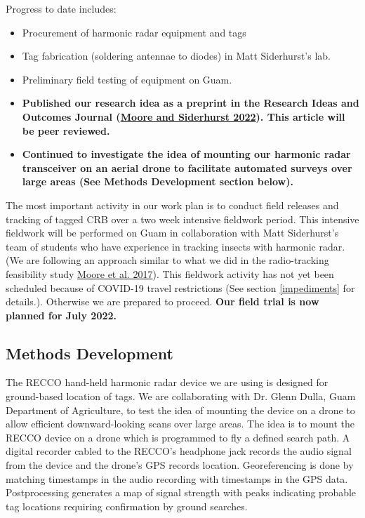 \documentclass[12pt,letterpaper,english,bibliography=totocnumbered,abstract=on]{scrartcl}
\begin{document}
Progress to date includes:
\begin{itemize}
\item Procurement of harmonic radar equipment and tags
\item Tag fabrication (soldering antennae to diodes) in Matt Siderhurst's lab.
\item Preliminary field testing of equipment on Guam.
\item \textbf{Published our research idea as a preprint in the Research Ideas and Outcomes Journal (\href{https://doi.org/10.3897/rio.8.e86422}{Moore and Siderhurst 2022}). This article will be peer reviewed.}
\item \textbf{Continued to investigate the idea of mounting our harmonic radar transceiver on an aerial drone to facilitate automated surveys over large areas (See Methods Development section below). }
\end{itemize}

The most important activity in our work plan is to conduct field releases and tracking of tagged CRB over a two week intensive fieldwork period. This intensive fieldwork will be performed on Guam in collaboration with Matt Siderhurst's team of students who have experience in tracking insects with harmonic radar. (We are following an approach similar to what we did in the radio-tracking feasibility study \href{https://academic.oup.com/ee/article/46/1/92/2633399?login=false}{Moore et al. 2017}). This fieldwork activity has not yet been scheduled because of COVID-19 travel restrictions (See section \ref{impediments} for details.). Otherwise we are prepared to proceed. \textbf{Our field trial is now planned for July 2022.}

\subsection{Methods Development}

The RECCO hand-held harmonic radar device we are using is designed for ground-based location of tags. We are collaborating with Dr. Glenn Dulla, Guam Department of Agriculture, to test the idea of mounting the device on a drone to allow efficient downward-looking scans over large areas. The idea is to mount the RECCO device on a drone which is programmed to fly a defined search path. A digital recorder cabled to the RECCO's headphone jack records the audio signal from the device and the drone's GPS  records location. Georeferencing is done by matching timestamps in the audio recording with timestamps in the GPS data. Postprocessing generates a map of signal strength with peaks indicating probable tag locations requiring confirmation by ground searches.
\end{document}
